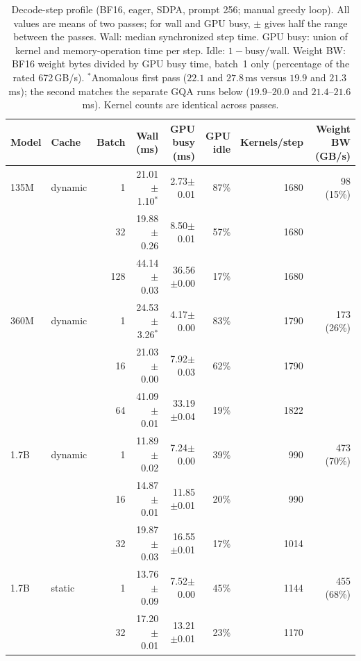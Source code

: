 \documentclass[11pt]{article}
\begin{document}
\begin{table}[!htbp]
\centering
\small
\begin{tabular}{llrrrrrr}
\toprule
Model & Cache & Batch & Wall (ms) & GPU busy (ms) & GPU idle & Kernels/step & Weight BW (GB/s) \\
\midrule
135M & dynamic & 1 & 21.01$\pm$1.10$^\ast$ & 2.73$\pm$0.01 & 87\% & 1680 & 98 (15\%) \\
 & & 32 & 19.88$\pm$0.26 & 8.50$\pm$0.01 & 57\% & 1680 & \\
 & & 128 & 44.14$\pm$0.03 & 36.56$\pm$0.00 & 17\% & 1680 & \\
\addlinespace
360M & dynamic & 1 & 24.53$\pm$3.26$^\ast$ & 4.17$\pm$0.00 & 83\% & 1790 & 173 (26\%) \\
 & & 16 & 21.03$\pm$0.00 & 7.92$\pm$0.03 & 62\% & 1790 & \\
 & & 64 & 41.09$\pm$0.01 & 33.19$\pm$0.04 & 19\% & 1822 & \\
\addlinespace
1.7B & dynamic & 1 & 11.89$\pm$0.02 & 7.24$\pm$0.00 & 39\% & 990 & 473 (70\%) \\
 & & 16 & 14.87$\pm$0.01 & 11.85$\pm$0.01 & 20\% & 990 & \\
 & & 32 & 19.87$\pm$0.03 & 16.55$\pm$0.01 & 17\% & 1014 & \\
\addlinespace
1.7B & static & 1 & 13.76$\pm$0.09 & 7.52$\pm$0.00 & 45\% & 1144 & 455 (68\%) \\
 & & 32 & 17.20$\pm$0.01 & 13.21$\pm$0.01 & 23\% & 1170 & \\
\bottomrule
\end{tabular}
\caption{Decode-step profile (BF16, eager, SDPA, prompt 256; manual greedy loop). All values are means of two passes; for wall and GPU busy, $\pm$ gives half the range between the passes. Wall: median synchronized step time. GPU busy: union of kernel and memory-operation time per step. Idle: $1-\text{busy}/\text{wall}$. Weight BW: BF16 weight bytes divided by GPU busy time, batch~1 only (percentage of the rated 672\,GB/s). $^\ast$Anomalous first pass ($22.1$ and $27.8$\,ms versus $19.9$ and $21.3$\,ms); the second matches the separate GQA runs below ($19.9$--$20.0$ and $21.4$--$21.6$\,ms). Kernel counts are identical across passes.}
\label{tab:profile}
\end{table}
\end{document}
